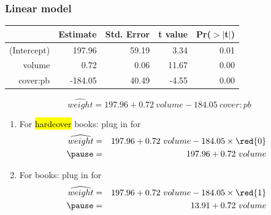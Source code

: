 \begin{frame}
\frametitle{Linear model}

{\small
\begin{center}
\begin{tabular}{rrrrr}
  \hline
 & Estimate & Std. Error & t value & Pr($>$$|$t$|$) \\
  \hline
(Intercept) & 197.96 & 59.19 & 3.34 & 0.01 \\
  volume & 0.72 & 0.06 & 11.67 & 0.00 \\
  cover:pb & -184.05 & 40.49 & -4.55 & 0.00 \\
   \hline
\end{tabular}
\end{center}
}

\pause

\[ \widehat{weight} = 197.96 + 0.72~volume - 184.05~cover:pb  \]

\pause

\begin{enumerate}

\item For \hl{hardcover} books: plug in  for 
\begin{eqnarray*}
\widehat{weight} &=& 197.96 + 0.72~volume - 184.05 \times \red{0} \\
\pause
&=& 197.96 +  0.72~volume
\end{eqnarray*}

\pause

\item For  books: plug in  for 
\begin{eqnarray*}
\widehat{weight} &=& 197.96 + 0.72~volume - 184.05 \times \red{1} \\
\pause
&=& 13.91 +  0.72~volume
\end{eqnarray*}

\end{enumerate}

\end{frame}


